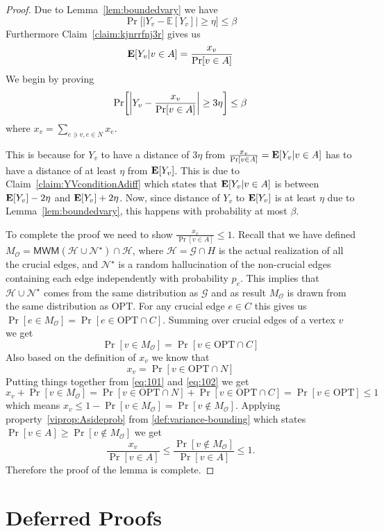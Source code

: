 \documentclass[letterpaper,11pt]{article}
\DeclareMathOperator{\E}{\ensuremath{\normalfont \textbf{E}}}
\newcommand{\mc}[1]{\ensuremath{\mathcal{#1}}}
\newcommand{\opt}[0]{\text{OPT}}
\newcommand{\MM}[0]{{\textsf{MWM}}}
\let\originalleft\left
\let\originalright\right
\renewcommand{\left}{\mathopen{}\mathclose\bgroup\originalleft}
\renewcommand{\right}{\aftergroup\egroup\originalright}
\renewcommand{\mc}[1]{\ensuremath{\mathcal{#1}}}
\begin{document}
\begin{proof}    
    
    Due to Lemma~\ref{lem:boundedvary} we have
    $$\Pr\Big[|Y_v - \mathbb{E}[Y_v]| \geq \eta \Big] \leq \beta$$
    Furthermore Claim~\ref{claim:kjnrrfnj3r} gives us  $$\E[Y_v|v\in A] = \frac{x_v}{\Pr[v\in  A]}$$
    We begin by proving
    \begin{equation}
     \Pr\left[\left |Y_v-\frac{x_v}{\Pr[v\in  A]}\right |\geq 3\eta\right]\leq \beta
 \end{equation}
 where $x_v = \sum_{e \ni v, e \in N} x_e$. 
 
 This is because for $Y_v$ to have a distance of $3\eta$ from 
 $\frac{x_v}{\Pr[v\in  A]} = \E[Y_v | v \in A]$  has to have a distance of at least $\eta$ from $\E[Y_v]$. This is due to Claim~\ref{claim:YVconditionAdiff} which states that $\E[Y_v | v \in A]$ is between $\E[Y_v] - 2 \eta$ and $\E[Y_v] + 2\eta$.
 Now, since distance of $Y_v$ to $\E[Y_v]$ is at least $\eta$ due to Lemma~\ref{lem:boundedvary}, this happens with probability at most $\beta$.
 
 To complete the proof we need to show $\frac{x_v}{\Pr[v\in  A]}\leq 1$. Recall that we have defined $M_{\mc{O}} = \MM(\mc{H}\cup \mc{N^\star})\cap \mc{H}$, where $\mc{H} = \mc{G}\cap H$ is the actual realization of all the crucial edges, and $\mc{N^\star}$ is a random hallucination of the non-crucial edges containing each edge independently with probability $p_e$. This implies that $\mc{H}\cup \mc{N^\star}$ comes from the same distribution as $\mc{G}$ and as result $M_{\mc{O}}$ is drawn from the same distribution as $\opt$. For any crucial edge $e\in C$ this gives us $\Pr[e\in M_{\mc{O}}]= \Pr[e\in \opt \cap C]$. Summing over crucial edges of a vertex $v$ we get
 \begin{equation}\label{eq:101}
 \Pr[v \in M_{\mc{O}}] = \Pr[v \in \opt \cap C] 
 \end{equation}
 Also based on the definition of $x_v$ we know that 
 \begin{equation}\label{eq:102}
   x_v = \Pr[v \in \opt \cap N]  
 \end{equation}
 Putting things together from \eqref{eq:101} and \eqref{eq:102} we get
  \begin{equation}
   x_v + \Pr[v \in M_{\mc{O}}] = \Pr[v \in \opt \cap N] + \Pr[v \in \opt \cap C] = \Pr[v \in \opt] \leq 1
 \end{equation}
 which means $x_v \leq 1 - \Pr[v \in M_{\mc{O}}] = \Pr[v \notin M_{\mc{O}}] $. Applying property~\ref{viprop:Asideprob} from \cref{def:variance-bounding} which states $\Pr[v\in A] \geq \Pr[v \notin M_{\mc{O}}]$ we get
 $$\frac{x_v}{\Pr[v \in A]} \leq \frac{\Pr[v \notin M_{\mc{O}}]}{\Pr[v\in A]} \leq 1.$$
 Therefore the proof of the lemma is complete. 
\end{proof} \section{Deferred Proofs}\label{section:proofs}
\end{document}
